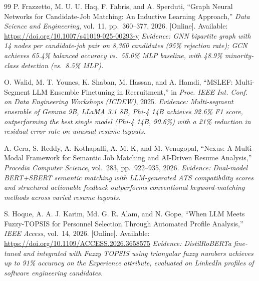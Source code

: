 \documentclass[journal]{IEEEtran}
\begin{document}
\begin{thebibliography}{99}
P. Frazzetto, M. U. U. Haq, F. Fabris, and A. Sperduti,
``Graph Neural Networks for Candidate-Job Matching: An Inductive Learning
Approach,''
\textit{Data Science and Engineering}, vol.~11, pp.~360--377, 2026.
[Online]. Available: \url{https://doi.org/10.1007/s41019-025-00293-y}
\textit{Evidence: GNN bipartite graph with 14 nodes per candidate-job pair on
8,360 candidates (95\% rejection rate); GCN achieves 65.4\% balanced accuracy
vs.\ 55.0\% MLP baseline, with 48.9\% minority-class detection (vs.\ 8.5\% MLP).}

O. Walid, M. T. Younes, K. Shaban, M. Hassan, and A. Hamdi,
``MSLEF: Multi-Segment LLM Ensemble Finetuning in Recruitment,''
in \textit{Proc. IEEE Int. Conf. on Data Engineering Workshops (ICDEW)}, 2025.
\textit{Evidence: Multi-segment ensemble of Gemma 9B, LLaMA 3.1 8B, Phi-4 14B
achieves 92.6\% F1 score, outperforming the best single model (Phi-4 14B, 90.6\%)
with a 21\% reduction in residual error rate on unusual resume layouts.}

A. Gera, S. Reddy, A. Kothapalli, A. M. K, and M. Venugopal,
``Nexus: A Multi-Modal Framework for Semantic Job Matching and AI-Driven
Resume Analysis,''
\textit{Procedia Computer Science}, vol.~283, pp.~922--935, 2026.
\textit{Evidence: Dual-model BERT+SBERT semantic matching with LLM-generated ATS
compatibility scores and structured actionable feedback outperforms conventional
keyword-matching methods across varied resume layouts.}

S. Hoque, A. A. J. Karim, Md. G. R. Alam, and N. Gope,
``When LLM Meets Fuzzy-TOPSIS for Personnel Selection Through Automated
Profile Analysis,''
\textit{IEEE Access}, vol.~14, 2026.
[Online]. Available: \url{https://doi.org/10.1109/ACCESS.2026.3658575}
\textit{Evidence: DistilRoBERTa fine-tuned and integrated with Fuzzy TOPSIS using
triangular fuzzy numbers achieves up to 91\% accuracy on the Experience attribute,
evaluated on LinkedIn profiles of software engineering candidates.}

\end{thebibliography}
\end{document}

